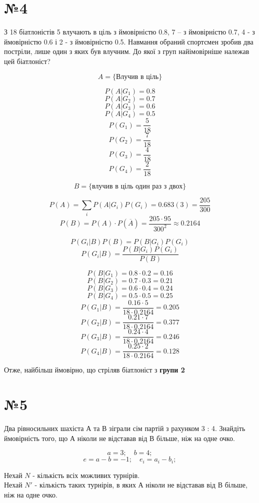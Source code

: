 \documentclass[11pt, a4paper]{article} %
\begin{document}
\section*{№4}

\begin{mdframed}
    З 18 біатлоністів 5 влучають в ціль з ймовірністю 0.8, 7 – з ймовірністю 0.7, 4
- з ймовірністю 0.6 і 2 - з ймовірністю 0.5. Навмання обраний спортсмен зробив
два постріли, лише один з яких був влучним. До якої з груп найімовірніше
належав цей біатлоніст?
\end{mdframed}

$$A = \{\text{Влучив в ціль}\}$$

$$P(A|G_1) = 0.8$$
$$P(A|G_2) = 0.7$$
$$P(A|G_3) = 0.6$$
$$P(A|G_4) = 0.5$$
$$P(G_1) = \frac{5}{18}$$
$$P(G_2) = \frac{7}{18}$$
$$P(G_3) = \frac{4}{18}$$
$$P(G_4) = \frac{2}{18}$$

$$B = \{\text{влучив в ціль один раз з двох}\}$$

$$P(A) = \sum_i P(A|G_i)P(G_i) = 0.683(3) = \frac{205}{300}$$
$$P(B) = P(A)\cdot P(\overline{A}) = \frac{205 \cdot 95}{300^2} \approx 0.2164$$


$$P(G_i|B)P(B) = P(B|G_i)P(G_i)$$
$$P(G_i|B) = \frac{P(B|G_i)P(G_i)}{P(B)}$$

$$P(B|G_1) = 0.8\cdot 0.2 = 0.16$$
$$P(B|G_2) = 0.7\cdot 0.3 = 0.21$$
$$P(B|G_3) = 0.6\cdot 0.4 = 0.24$$
$$P(B|G_4) = 0.5\cdot 0.5 = 0.25$$
$$P(G_1|B) = \frac{0.16\cdot 5}{18 \cdot 0.2164} = 0.205$$
$$P(G_2|B) = \frac{0.21\cdot 7}{18 \cdot 0.2164} = 0.377$$
$$P(G_3|B) = \frac{0.24\cdot 4}{18 \cdot 0.2164} = 0.246$$
$$P(G_4|B) = \frac{0.25\cdot 2}{18 \cdot 0.2164} = 0.128$$

\begin{mdframed}[style=ans]
    Отже, найбільш ймовірно, що стріляв біатлоніст з \textbf{групи 2}
\end{mdframed}

\section*{№5}
\begin{mdframed}
    Два рівносильних шахіста А та В зіграли сім партій з рахунком 3 : 4. Знайдіть
ймовірність того, що А ніколи не відставав від В більше, ніж на одне очко.
\end{mdframed}

$$a=3;\quad b=4;$$
$$e = a-b = -1;\quad e_i = a_i-b_i;$$

Нехай $N$ - кількість всіх можливих турнірів.\\
Нехай $N'$ - кількість таких турнірів, в яких  А ніколи не відставав від В більше, ніж на одне очко.
\end{document}
